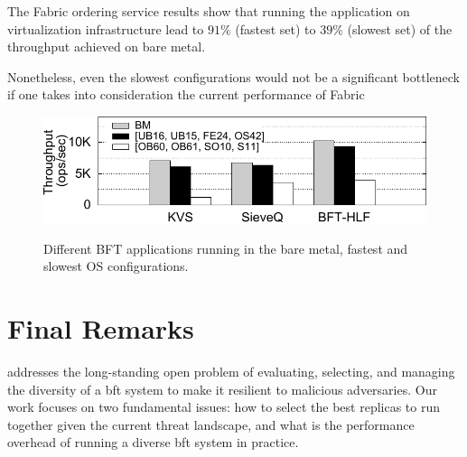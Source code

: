 The Fabric ordering service results show that running the application on \system virtualization infrastructure lead to $91\%$ (fastest set) to $39\%$ (slowest set) of the throughput achieved on bare metal. 

Nonetheless, even the slowest configurations would not be a significant bottleneck if one takes into consideration the current performance of Fabric~\cite{Sousa:2018}

\begin{figure}[t]
\begin{center}
\includegraphics[width=\columnwidth]{images/gnuplot/vagrant/runs_apps/throughput.pdf}
\vspace{-5mm}
\caption{Different BFT applications running in the bare metal, fastest and slowest OS configurations.}
\vspace{-3mm}
\label{fig:apps}
\end{center}
\end{figure}



\section{Final Remarks}
\label{sec:finalremarkslazarus}

\system addresses the long-standing open problem of evaluating, selecting, and managing the diversity of a \gls{bft} system to make it resilient to malicious adversaries.
Our work focuses on two fundamental issues: how to select the best replicas to run together given the current threat landscape, and what is the performance overhead of running a diverse \gls{bft} system in practice.

